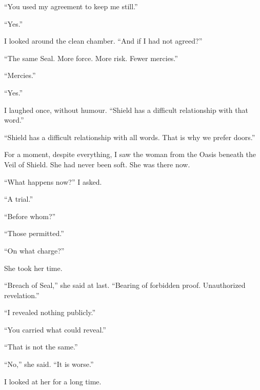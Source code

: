 ``You used my agreement to keep me still.''\par

``Yes.''\par

I looked around the clean chamber. ``And if I had not agreed?''\par

``The same Seal. More force. More risk. Fewer mercies.''\par

``Mercies.''\par

``Yes.''\par

I laughed once, without humour. ``Shield has a difficult relationship with that word.''\par

``Shield has a difficult relationship with all words. That is why we prefer doors.''\par

For a moment, despite everything, I saw the woman from the Oasis beneath the Veil of Shield. She had never been soft. She was there now.\par

``What happens now?'' I asked.\par

``A trial.''\par

``Before whom?''\par

``Those permitted.''\par

``On what charge?''\par

She took her time.\par

``Breach of Seal,'' she said at last. ``Bearing of forbidden proof. Unauthorized revelation.''\par

``I revealed nothing publicly.''\par

``You carried what could reveal.''\par

``That is not the same.''\par

``No,'' she said. ``It is worse.''\par

I looked at her for a long time.\par

